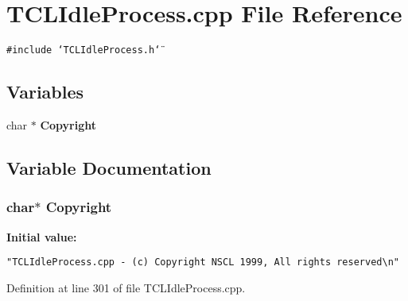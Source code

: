 \section{TCLIdle\-Process.cpp File Reference}
\label{TCLIdleProcess_8cpp}
{\tt \#include \char`\"{}TCLIdle\-Process.h\char`\"{}}\par
\subsection*{Variables}
\begin{CompactItemize}
\item 
char $\ast$ {\bf Copyright}
\end{CompactItemize}


\subsection{Variable Documentation}
\subsubsection{\setlength{\rightskip}{0pt plus 5cm}char$\ast$ Copyright\hspace{0.3cm}{\tt  [static]}}\label{TCLIdleProcess_8cpp_a0}


{\bf Initial value:}

\footnotesize\begin{verbatim}
"TCLIdleProcess.cpp - (c) Copyright NSCL 1999, All rights reserved\n"\end{verbatim}\normalsize 


Definition at line 301 of file TCLIdle\-Process.cpp.